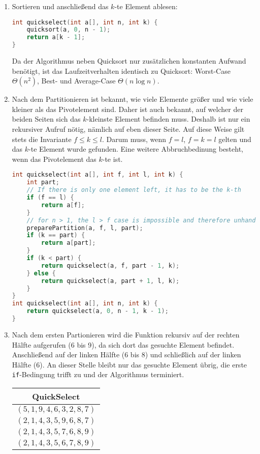 \documentclass[11pt,a4paper]{article}
\begin{document}
\begin{loesung}
    
    \begin{enumerate}
        \item Sortieren und anschließend das $k$-te Element ablesen:
        \begin{lstlisting}[language=c++]
int quickselect(int a[], int n, int k) {
    quicksort(a, 0, n - 1);
    return a[k - 1];
}
        \end{lstlisting}
        Da der Algorithmus neben Quicksort nur zusätzlichen konstanten Aufwand benötigt, ist das Laufzeitverhalten identisch zu Quicksort: Worst-Case $\Theta(n^2)$, Best- und Average-Case $\Theta(n \log n)$.

        \item
        Nach dem Partitionieren ist bekannt, wie viele Elemente größer und wie viele kleiner als das Pivotelement sind.
        Daher ist auch bekannt, auf welcher der beiden Seiten sich das $k$-kleinste Element befinden muss.
        Deshalb ist nur ein rekursiver Aufruf nötig, nämlich auf eben dieser Seite.
        Auf diese Weise gilt stets die Invariante $f \leq k \leq l$.
        Darum muss, wenn $f = l$, $f = k = l$ gelten und das $k$-te Element wurde gefunden.
        Eine weitere Abbruchbedinung besteht, wenn das Pivotelement das $k$-te ist.
        \begin{lstlisting}[language=c++]
int quickselect(int a[], int f, int l, int k) {
    int part;
    // If there is only one element left, it has to be the k-th
    if (f == l) {
        return a[f];
    }
    // for n > 1, the l > f case is impossible and therefore unhandled
    preparePartition(a, f, l, part);
    if (k == part) {
        return a[part];
    }
    if (k < part) {
        return quickselect(a, f, part - 1, k);
    } else {
        return quickselect(a, part + 1, l, k);
    }
}
int quickselect(int a[], int n, int k) {
    return quickselect(a, 0, n - 1, k - 1);
}
        \end{lstlisting}

        \item
        Nach dem ersten Partionieren wird die Funktion rekursiv auf der rechten Hälfte aufgerufen (6 bis 9), da sich dort das gesuchte Element befindet.
        Anschließend auf der linken Hälfte (6 bis 8) und schließlich auf der linken Hälfte (6).
        An dieser Stelle bleibt nur das gesuchte Element übrig, die erste \texttt{if}-Bedingung trifft zu und der Algorithmus terminiert.
        \begin{table}[h!]
            \centering
            \begin{tabular}{|c|}
            \hline
            \textbf{QuickSelect} \\ \hline
                $(5, 1, 9, 4, 6, 3, 2, 8, 7)$ \\ \hline
                $(2, 1, 4, 3, 5, 9, 6, 8, 7)$ \\ \hline
                $(2, 1, 4, 3, 5, 7, 6, 8, 9)$ \\ \hline
                $(2, 1, 4, 3, 5, 6, 7, 8, 9)$ \\ \hline
            \end{tabular}
        \end{table}


\end{enumerate}
\end{loesung}
\end{document}
